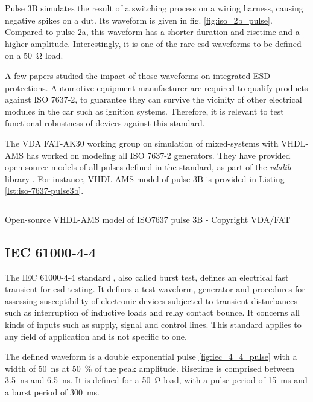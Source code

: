 Pulse 3B simulates the result of a switching process on a wiring harness, causing negative spikes on a \gls{dut}.
Its waveform is given in fig. \ref{fig:iso_2b_pulse}.
Compared to pulse 2a, this waveform has a shorter duration and risetime and a higher amplitude.
Interestingly, it is one of the rare \gls{esd} waveforms to be defined on a \SI{50}{\ohm} load.

A few papers \cite{is-iso7637-real, iso7637-2-new-automotive-reqs, robustness-esd-iso7637} studied the impact of those waveforms on integrated ESD protections.
Automotive equipment manufacturer are required to qualify products against ISO 7637-2, to guarantee they can survive the vicinity of other electrical modules in the car such as ignition systems.
Therefore, it is relevant to test functional robustness of devices against this standard.

The VDA FAT-AK30 working group on simulation of mixed-systems with VHDL-AMS \cite{fat-ak30} has worked on modeling all ISO 7637-2 generators. They have provided open-source models of all pulses defined in the standard, as part of the \textit{vdalib} library \cite{vdalib}.
For instance, VHDL-AMS model of pulse 3B is provided in Listing \ref{lst:iso-7637-pulse3b}.

\begin{code}
\inputminted[frame=single,firstline=157,lastline=224]{VHDL}{src/1/snippets/iso_7637_pulse3b.vhd}
\caption{Open-source VHDL-AMS model of ISO7637 pulse 3B - Copyright VDA/FAT}
\label{lst:iso-7637-pulse3b}
\end{code}


\subsection{IEC 61000-4-4}

The IEC 61000-4-4 standard \cite{iec61000-4-4}, also called burst test, defines an electrical fast transient for \gls{esd} testing.
It defines a test waveform, generator and procedures for assessing susceptibility of electronic devices subjected to transient disturbances such as interruption of inductive loads and relay contact bounce.
It concerns all kinds of inputs such as supply, signal and control lines.
This standard applies to any field of application and is not specific to one.

The defined waveform is a double exponential pulse \ref{fig:iec_4_4_pulse} with a width of \SI{50}{\nano\second} at \SI{50}{\percent} of the peak amplitude.
Risetime is comprised between \SI{3.5}{\nano\second} and \SI{6.5}{\nano\second}.
It is defined for a \SI{50}{\ohm} load, with a pulse period of \SI{15}{\milli\second} and a burst period of \SI{300}{\milli\second}.

